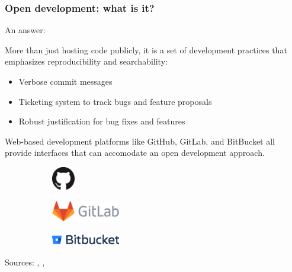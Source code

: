 \begin{frame}
  \frametitle{Open development: what is it?}
  \pause\medskip
  An answer:

  More than just hosting code publicly, it is a set of development practices that emphasizes reproducibility and searchability:
  \begin{itemize}
      \item Verbose commit messages
      \item Ticketing system to track bugs and feature proposals
      \item Robust justification for bug fixes and features
  \end{itemize}
  
  Web-based development platforms like GitHub, GitLab, and BitBucket all provide interfaces that can accomodate an open development approach. 
  \begin{figure}[htpb]
      \begin{subfigure}
          \centering
          \includegraphics[width=1cm]{images/github-mark.eps}
      \end{subfigure}
      \begin{subfigure}
          \centering
          \includegraphics[width=3cm]{images/gitlab-logo.eps}
      \end{subfigure}
      \begin{subfigure}
          \centering
          \includegraphics[width=3cm]{images/bitbucket-logo.eps}
      \end{subfigure}
  \end{figure}
  \begin{center}
      {\tiny Sources: \cite{github_logo}, \cite{gitlab_logo}, \cite{bitbucket_logo}}
  \end{center}
\end{frame}

